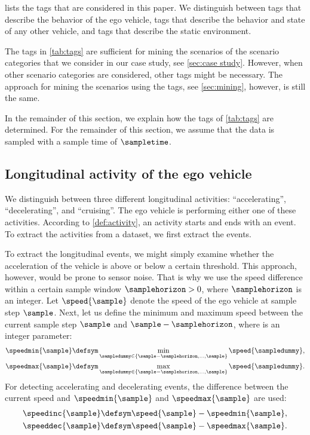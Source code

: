 \cstarta
{} lists the tags that are considered in this paper. 
We distinguish between tags that describe the behavior of the ego vehicle, tags that describe the behavior and state of any other vehicle, and tags that describe the static environment. 
\begin{remark}
	The tags in \cref{tab:tags} are sufficient for mining the scenarios of the scenario categories that we consider in our case study, see \cref{sec:case study}. However, when other scenario categories are considered, other tags might be necessary. The approach for mining the scenarios using the tags, see \cref{sec:mining}, however, is still the same.
\end{remark}
\cenda

In the remainder of this section, we explain how the tags of \cref{tab:tags} are determined. 
For the remainder of this section, we assume that the data is sampled with a sample time of $\sampletime$.



\subsection{Longitudinal activity of the ego vehicle}
\label{sec:longitudinal ego}

We distinguish between three different longitudinal activities: ``accelerating'', ``decelerating'', and ``cruising''. 
The ego vehicle is performing either one of these activities. 
According to \cref{def:activity}, an activity starts and ends with an event. 
To extract the activities from a dataset, we first extract the events. 

\cstarta To extract the longitudinal events, we might simply examine whether the acceleration of the vehicle is above or below a certain threshold. 
This approach, however, would be prone to sensor noise. 
That is why we use the speed difference within a certain sample window $\samplehorizon>0$, where $\samplehorizon$ is an integer.
Let $\speed{\sample}$ denote the speed of the ego vehicle at sample step $\sample$. 
Next, let us define the minimum and maximum speed between the current sample step $\sample$ and $\sample-\samplehorizon$, where  is an integer parameter:
\begin{align}
	\speedmin{\sample} &\defsym \min_{\sampledummy \in \left\{ \sample-\samplehorizon, \ldots, \sample \right\} } \speed{\sampledummy}, \\
	\speedmax{\sample} &\defsym \max_{\sampledummy \in \left\{ \sample-\samplehorizon, \ldots, \sample \right\} } \speed{\sampledummy}.
\end{align}\cenda
For detecting accelerating and decelerating events, the difference between the current speed and $\speedmin{\sample}$ and $\speedmax{\sample}$ are used:
\begin{align}
	\speedinc{\sample} &\defsym \speed{\sample} - \speedmin{\sample},\\
	\speeddec{\sample} &\defsym \speed{\sample} - \speedmax{\sample}.
\end{align}

